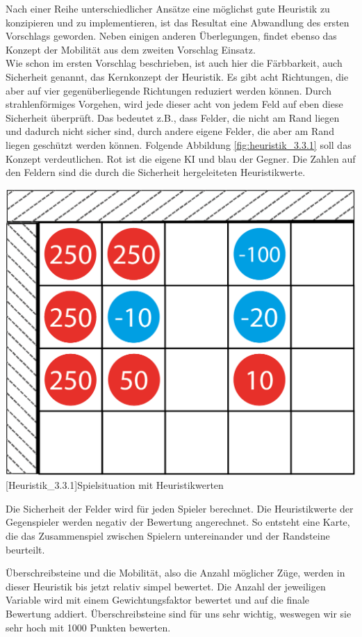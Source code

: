 \documentclass[12pt,a4paper,bibliography=totocnumbered,listof=totocnumbered]{scrartcl}
\begin{document}
	Nach einer Reihe unterschiedlicher Ansätze eine möglichst gute Heuristik zu konzipieren und zu implementieren, ist das Resultat eine Abwandlung des ersten Vorschlags geworden. Neben einigen anderen Überlegungen, findet ebenso das Konzept der Mobilität aus dem zweiten Vorschlag Einsatz.\\
	Wie schon im ersten Vorschlag beschrieben, ist auch hier die \glqq Färbbarkeit\grqq, auch \glqq Sicherheit\grqq{}  genannt, das Kernkonzept der Heuristik. Es gibt acht Richtungen, die aber auf vier gegenüberliegende Richtungen reduziert werden können. Durch strahlenförmiges Vorgehen, wird jede dieser acht von jedem Feld auf eben diese \glqq Sicherheit\grqq{}  überprüft. Das bedeutet z.B., dass Felder, die nicht am Rand liegen und dadurch nicht sicher sind, durch andere eigene Felder, die aber am Rand liegen geschützt werden können. Folgende Abbildung  \ref{fig:heuristik_3.3.1} soll das Konzept verdeutlichen. Rot ist die eigene KI und blau der Gegner. Die Zahlen auf den Feldern sind die durch die \glqq Sicherheit\grqq{} hergeleiteten Heuristikwerte.
	
	\vspace{1em}
	\begin{minipage}{\linewidth}
		\centering
		\includegraphics[width=0.4\linewidth]{pics/Kapitel_3/Kapitel_3_pic8.png}
		[Heuristik_3.3.1]{Spielsituation mit Heuristikwerten\footnotemark }
		\label{fig:heuristik_3.3.1}
	\end{minipage}

	Die \glqq Sicherheit\grqq{} der Felder wird für jeden Spieler berechnet. Die Heuristikwerte der Gegenspieler werden negativ der Bewertung angerechnet. So entsteht eine Karte, die das Zusammenspiel zwischen Spielern untereinander und der Randsteine beurteilt.
	
	Überschreibsteine und die Mobilität, also die Anzahl möglicher Züge, werden in dieser Heuristik bis jetzt relativ simpel bewertet. Die Anzahl der jeweiligen Variable wird mit einem Gewichtungsfaktor bewertet und auf die finale Bewertung addiert. Überschreibsteine sind für uns sehr wichtig, weswegen wir sie sehr hoch mit 1000 Punkten bewerten.
	
\end{document}
